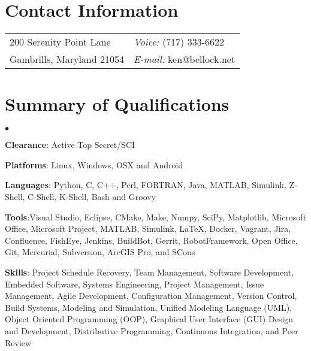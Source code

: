 \documentclass[margin,line]{res}
\newenvironment{list2}{%
  \begin{list}{$\bullet$}{%
      \setlength{\itemsep}{0in}
      \setlength{\parsep}{0in} \setlength{\parskip}{0in}
      \setlength{\topsep}{0in} \setlength{\partopsep}{0in} 
  \setlength{\leftmargin}{0.2in}}}{\end{list}}
\begin{document}

\begin{resume}

\section{\sc Contact Information}\vspace{.05in}
\begin{tabular}{@{}p{4in}p{4in}}
200 Serenity Point Lane   & \emph{Voice:}  (717) 333-6622 \\            
Gambrills, Maryland 21054 & \emph{E-mail:}  ken@bellock.net\\         
\end{tabular}

\section{\sc Summary of Qualifications} 
\begin{list2}
\item \textbf{Clearance}: Active Top Secret/SCI
\item \textbf{Platforms}: Linux, Windows, OSX and Android
\item \textbf{Languages}: Python, C, C++, Perl, FORTRAN, Java, MATLAB, Simulink, Z-Shell, C-Shell, K-Shell, Bash and Groovy
\item \textbf{Tools}:Visual Studio, Eclipse, CMake, Make, Numpy, SciPy, Matplotlib, Microsoft Office, Microsoft Project,  MATLAB, Simulink, \LaTeX, Docker, Vagrant, Jira, Confluence, FishEye, Jenkins, BuildBot, Gerrit, RobotFramework, Open Office, Git, Mercurial, Subversion, ArcGIS Pro, and  SCons
\item \textbf{Skills}: Project Schedule Recovery, Team Management, Software Development, Embedded Software, Systems Engineering, Project Management, Issue Management, Agile Development, Configuration Management, Version Control, Build Systems, Modeling and Simulation, Unified Modeling Language (UML), Object Oriented Programming (OOP), Graphical User Interface (GUI) Design and Development, Distributive Programming, Continuous Integration,  and Peer Review
\end{list2}


\end{resume}
\end{document}
